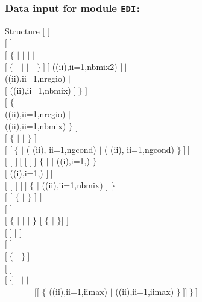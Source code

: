 \subsubsection{Data input for module {\tt EDI:}}\label{sect:descedi}

\begin{DataStructure}{Structure }
$[$   $]$ \\
$[$  $]$ \\
$[$  $\{$  $|$  $|$  $|$  $|$ \\
\hskip 1.0cm  $[~\{$  $|$  $|$  $|$  $|$  $\}~]~[$  ((ii),ii=1,nbmix2) $]~|$ \\
\hskip 1.0cm  ((ii),ii=1,nregio) $|$ \\
\hskip 1.0cm  $[$ ((ii),ii=1,nbmix) $]~\}$ $]$ \\
$[$  $\{$ \\
\hskip 1.0cm  ((ii),ii=1,nregio) $|$ \\
\hskip 1.0cm  ((ii),ii=1,nbmix) $\}$ $]$  \\
$[$ $\{$  $|$  $|$  $\}$ $]$ \\
$[$  $[~\{$   $|$ ( (ii), ii=1,ngcond) $|$ ( (ii), ii=1,ngcond) $\}~]~]$\\
$[$  $[$  $]~[$  $[$  $]~]$ $\{$  $|$  $|$ 
   ((i),i=1,) $\}$\\
\hskip 1.0cm $[$   ((i),i=1,) $]~]$\\
$[$  $[$  $[$  $]~]$ $\{$  $|$ ((ii),ii=1,nbmix) $]$ $\}$\\ 
$[$  $[$  $\{$  $|$  $\}$ $]$ $]$ \\
$[$  $]$ \\
$[$  $\{$  $|$  $|$  $|$  $\}$  
  $[$  $\{$  $|$  $\}$$]$ $]$ \\
$[$  $]~[$  $]$ \\
$[$   $]$ \\
$[~\{$  $|$  $\}~]$ \\
$[$   $]$ \\
$[~\{$  $|$  $|$  $|$  $|$\\
~~~~~~~$[[$   $\{$  ((ii),ii=1,iimax)   $|$  ((ii),ii=1,iimax)   $\}~]]~\}~]$
\end{DataStructure}

